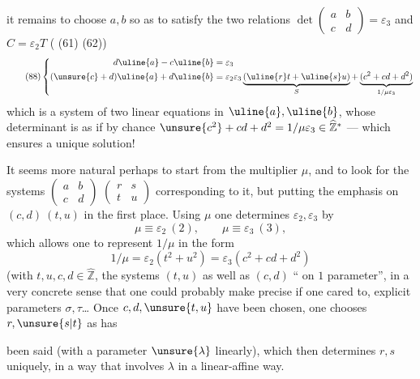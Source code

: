 

it remains to choose $a,b$ so as to satisfy the two relations
$\det\begin{pmatrix}a&b\\c&d\end{pmatrix}=\varepsilon_3$
and $C=\varepsilon_2 T$ ( (61) (62))
\[
\tag{88}
\left\{\begin{aligned}
d\uline{a}-c\uline{b}&=\varepsilon_3\\
(\unsure{c}+d)\uline{a}+d\uline{b}
&=\varepsilon_2\varepsilon_3
\underbrace{(\uline{r}t+\uline{s}u)}_{S}
+\underbrace{(c^2+cd+d^2)}_{1/\mu\varepsilon_3}
\end{aligned}\right.
\]
which is a system of two linear equations in $\uline{a},\uline{b}$,
whose determinant is as if by chance
$\unsure{c^2}+cd+d^2=1/\mu\varepsilon_3\in\widehat{\mathbb Z}^{*}$
--- which ensures a unique solution!

It seems more natural perhaps to start from the multiplier $\mu$, and to
look for the systems
$\begin{pmatrix}a&b\\c&d\end{pmatrix}$
$\begin{pmatrix}r&s\\t&u\end{pmatrix}$ corresponding to it,
but putting the emphasis on $(c,d)\ (t,u)$ in the first place.
Using $\mu$ one determines $\varepsilon_2,\varepsilon_3$ by
\[
\mu\equiv\varepsilon_2\ (2),\qquad
\mu\equiv\varepsilon_3\ (3),
\]
 which allows one to  represent
$1/\mu$ in the form
\[
1/\mu=\varepsilon_2(t^2+u^2)=\varepsilon_3(c^2+cd+d^2)
\]
(with $t,u,c,d\in\widehat{\mathbb Z}$, the systems $(t,u)$ as well as
$(c,d)$ `` on $1$ parameter'', 
in a very concrete sense that one could probably make precise if one cared to,
explicit parameters  $\sigma,\tau$\ldots{} Once
$c,d,\unsure{t,u}$ have been chosen, one chooses $r,\unsure{s|t}$ as has



been said (with a parameter $\unsure{\lambda}$ 
linearly), which then determines $r,s$ uniquely, in a way
that involves $\lambda$  in a
linear-affine way.

